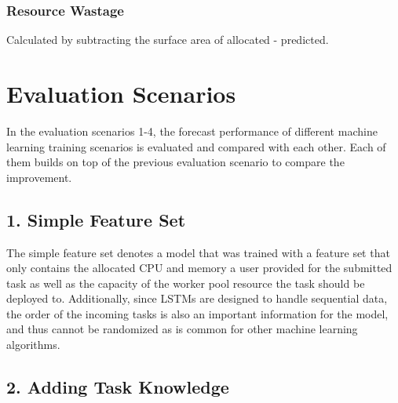 
    \subsubsection{Resource Wastage}
    \label{sec:resource-wastage-metric-evaluation}
      Calculated by subtracting the surface area of allocated - predicted.

\section{Evaluation Scenarios}
\label{sec:evaluation-scenarios}

    In the evaluation scenarios 1-4, the forecast performance of different machine learning training scenarios is evaluated and compared with each other. Each of them builds on top of the previous evaluation scenario to compare the improvement.

  \subsection{1. Simple Feature Set}
  \label{sec:simple-feature-set-evaluation-scenarios}
    
    The simple feature set denotes a  model that was trained with a feature set that only contains the allocated CPU and memory a user provided for the submitted task as well as the capacity of the worker pool resource the task should be deployed to. Additionally, since LSTMs are designed to handle sequential data, the order of the incoming tasks is also an important information for the model, and thus cannot be randomized as is common for other machine learning algorithms.

  \subsection{2. Adding Task Knowledge}
  \label{sec:adding-task-knowledge-evaluation-scenarios}

